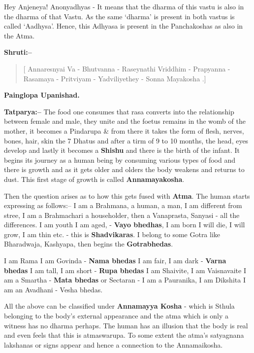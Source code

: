 Hey Anjeneya! Anonyadhyas - It means that the dharma of this vastu is also in the dharma of that Vastu. As the same ‘dharma’ is present in both vastus is called ‘Aadhysa’. Hence, this Adhyasa is present in the Panchakoshas as also in the Atma.

\textbf{Shruti:–}

\begin{verse}
[ Annaresnyai Va - Bhutvanna - Raseynathi Vriddhim - Prapyanna - Rasamaya - Pritviyam - Yadviliyethey - Sonna Mayakosha .]
\end{verse}

\begin{flushright}
\textbf{Painglopa Upanishad.}
\end{flushright}

\textbf{Tatparya:–} The food one consumes that rasa converts into the relationship between female and male, they unite and the foetus remains in the womb of the mother, it becomes a Pindarupa \& from there it takes the form of flesh, nerves, bones, hair, skin the 7 Dhatus and after a tirm of 9 to 10 months, the head, eyes develop and lastly it becomes a \textbf{Shishu} and there is the birth of the infant. It begins its journey as a human being by consuming various types of food and there is growth and as it gets older and olders the body weakens and returns to dust. This first stage of growth is called \textbf{Annamayakosha}.

Then the question arises as to how this gets fused with \textbf{Atma}. The human starts expressing as follows:– I am a Brahmana, a human, a man, I am different from stree, I am a Brahmachari a householder, then a Vanaprasta, Sanyasi - all the differences. I am youth I am aged, - \textbf{Vayo bhedhas}, I am born I will die, I will grow, I am thin etc. - this is \textbf{Shadvikaras}. I belong to some Gotra like Bharadwaja, Kashyapa, then begins the \textbf{Gotrabhedas}.

I am Rama I am Govinda - \textbf{Nama bhedas} I am fair, I am dark - \textbf{Varna bhedas} I am tall, I am short - \textbf{Rupa bhedas} I am Shaivite, I am Vaisnavaite I am a Smartha - \textbf{Mata bhedas} or Sectaran - I am a Pauranika, I am Dikshita I am an Avadhani - Vesha bhedas.

All the above can be classified under \textbf{Annamayya Kosha} - which is Sthula belonging to the body's external appearance and the atma which is only a witness has no dharma perhaps. The human has an illusion that the body is real and even feels that this is atmaswarupa. To some extent the atma's satyagnana lakshanas or signs appear and hence a connection to the Annamaikosha.

